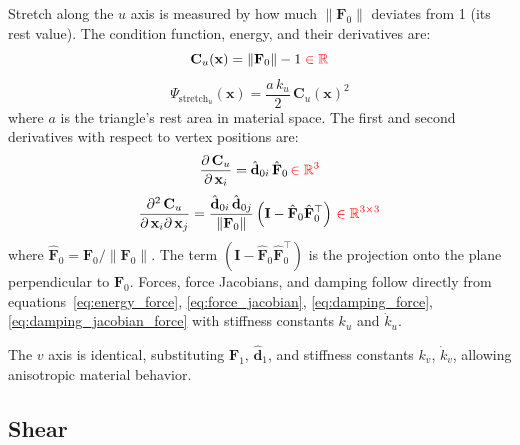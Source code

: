 \documentclass{article}
\newcommand{\pd}[2]{\dfrac{\partial\, #1}{\partial\, #2}}
\newcommand{\pdm}[3]{\dfrac{\partial^2\, #1}{\partial\, #2 \partial\, #3}}
\newcommand{\drop}[1]{\textcolor{red}{#1}}
\begin{document}
Stretch along the $u$ axis is measured by how much $\|\mathbf{F}_0\|$ deviates from 1 (its rest value). The condition function, energy, and their derivatives are:
\begin{equation}
    \mathbf{C}_u(\mathbf{x}) = \|\mathbf{F}_0\| - 1\; \drop{\in \mathbb{R}}
\end{equation}
\begin{equation}
    \Psi_{\text{stretch}_u}(\mathbf{x}) = \frac{a\,k_u}{2}\,\mathbf{C}_u(\mathbf{x})^2
\end{equation}
where $a$ is the triangle's rest area in material space. The first and second derivatives with respect to vertex positions are:
\begin{equation}
    \pd{\mathbf{C}_u}{\mathbf{x}_i} = 
        \hat{\mathbf{d}}_{0i}\,\hat{\mathbf{F}}_0 
        \,\drop{\in \mathbb{R}^3}
\end{equation}
\begin{equation}
    \pdm{\mathbf{C}_u}{\mathbf{x}_i}{\mathbf{x}_j} = 
        \frac{\hat{\mathbf{d}}_{0i}\,\hat{\mathbf{d}}_{0j}}{\|\mathbf{F}_0\|}
        \left(\mathbf{I} - \hat{\mathbf{F}}_0\hat{\mathbf{F}}_0^\top\right) 
        \,\drop{\in \mathbb{R}^{3\times3}}
\end{equation}
where $\hat{\mathbf{F}}_0 = \mathbf{F}_0/\|\mathbf{F}_0\|$. The term $(\mathbf{I} - \hat{\mathbf{F}}_0\hat{\mathbf{F}}_0^\top)$ is the projection onto the plane perpendicular to $\mathbf{F}_0$. Forces, force Jacobians, and damping follow directly from equations~\ref{eq:energy_force}, \ref{eq:force_jacobian}, \ref{eq:damping_force}, \ref{eq:damping_jacobian_force} with stiffness constants $k_u$ and $\dot{k}_u$.

The $v$ axis is identical, substituting $\mathbf{F}_1$, $\hat{\mathbf{d}}_1$, and stiffness constants $k_v$, $\dot{k}_v$, allowing anisotropic material behavior.

\subsection{Shear}
\end{document}
